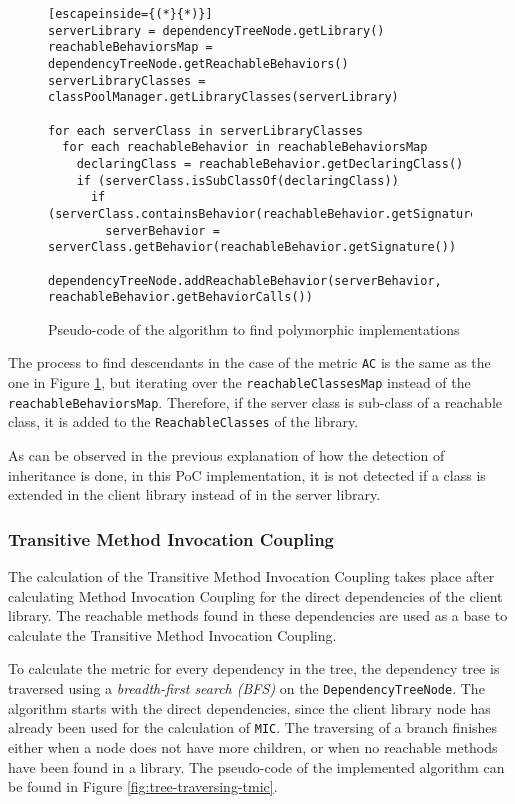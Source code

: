 \begin{figure}[ht!]
\begin{lstlisting}[escapeinside={(*}{*)}]
serverLibrary = dependencyTreeNode.getLibrary()
reachableBehaviorsMap = dependencyTreeNode.getReachableBehaviors()
serverLibraryClasses = classPoolManager.getLibraryClasses(serverLibrary)

for each serverClass in serverLibraryClasses
  for each reachableBehavior in reachableBehaviorsMap
    declaringClass = reachableBehavior.getDeclaringClass()
    if (serverClass.isSubClassOf(declaringClass))
      if (serverClass.containsBehavior(reachableBehavior.getSignature()))
        serverBehavior = serverClass.getBehavior(reachableBehavior.getSignature())
        dependencyTreeNode.addReachableBehavior(serverBehavior, reachableBehavior.getBehaviorCalls())
\end{lstlisting}
\caption{Pseudo-code of the algorithm to find polymorphic implementations}
\label{fig:algorithm-polymorphy}
\end{figure}

The process to find descendants in the case of the metric \texttt{AC} is the same as the one in Figure \ref{fig:algorithm-polymorphy}, but iterating over the \texttt{reachableClassesMap} instead of the \texttt{reachableBehaviorsMap}. Therefore, if the server class is sub-class of a reachable class, it is added to the \texttt{ReachableClasses} of the library.

\blankl
As can be observed in the previous explanation of how the detection of inheritance is done, in this PoC implementation, it is not detected if a class is extended in the client library instead of in the server library.

\subsubsection{Transitive Method Invocation Coupling}

The calculation of the Transitive Method Invocation Coupling takes place after calculating Method Invocation Coupling for the direct dependencies of the client library. The reachable methods found in these dependencies are used as a base to calculate the Transitive Method Invocation Coupling.

To calculate the metric for every dependency in the tree, the dependency tree is traversed using a \textit{breadth-first search (BFS)} on the \texttt{DependencyTreeNode}. The algorithm starts with the direct dependencies, since the client library node has already been used for the calculation of \texttt{MIC}. The traversing of a branch finishes either when a node does not have more children, or when no reachable methods have been found in a library. The pseudo-code of the implemented algorithm can be found in Figure \ref{fig:tree-traversing-tmic}.

